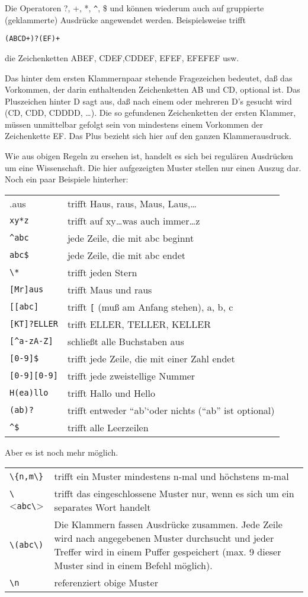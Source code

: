\documentclass[12pt,]{article}
\begin{document}
Die Operatoren ?, +, *, \texttt{\^{}}, \$ und \textbar{} können wiederum
auch auf gruppierte (geklammerte) Ausdrücke angewendet werden.
Beispielsweise trifft

\texttt{(AB\textbar{}CD+)?(EF)+}

die Zeichenketten ABEF, CDEF,CDDEF, EFEF, EFEFEF usw.

Das hinter dem ersten Klammernpaar stehende Fragezeichen bedeutet, daß
das Vorkommen, der darin enthaltenden Zeichenketten AB und CD, optional
ist. Das Pluszeichen hinter D sagt aus, daß nach einem oder mehreren D's
gesucht wird (CD, CDD, CDDDD, \ldots{}). Die so gefundenen Zeichenketten
der ersten Klammer, müssen unmittelbar gefolgt sein von mindestens einem
Vorkommen der Zeichenkette EF. Das Plus bezieht sich hier auf den ganzen
Klammerausdruck.

Wie aus obigen Regeln zu ersehen ist, handelt es sich bei regulären
Ausdrücken um eine Wissenschaft. Die hier aufgezeigten Muster stellen
nur einen Auszug dar. Noch ein paar Beispiele hinterher:

\begin{longtable}[c]{@{}ll@{}}
\toprule
.aus & trifft Haus, raus, Maus, Laus,\ldots{}\tabularnewline
\texttt{xy*z} & trifft auf xy\ldots{}was auch
immer\ldots{}z\tabularnewline
\texttt{\^{}abc} & jede Zeile, die mit abc beginnt\tabularnewline
\texttt{abc\$} & jede Zeile, die mit abc endet\tabularnewline
\texttt{\textbackslash{}*} & trifft jeden Stern\tabularnewline
\texttt{{[}Mr{]}aus} & trifft Maus und raus\tabularnewline
\texttt{{[}{[}abc{]}} & trifft \texttt{{[}} (muß am Anfang stehen), a,
b, c\tabularnewline
\texttt{{[}KT{]}?ELLER} & trifft ELLER, TELLER, KELLER\tabularnewline
\texttt{{[}\^{}a-zA-Z{]}} & schließt alle Buchstaben aus\tabularnewline
\texttt{{[}0-9{]}\$} & trifft jede Zeile, die mit einer Zahl
endet\tabularnewline
\texttt{{[}0-9{]}{[}0-9{]}} & trifft jede zweistellige
Nummer\tabularnewline
\texttt{H(e\textbar{}a)llo} & trifft Hallo und Hello\tabularnewline
\texttt{(ab)?} & trifft entweder ``ab'`oder nichts (``ab'' ist
optional)\tabularnewline
\texttt{\^{}\$} & trifft alle Leerzeilen\tabularnewline
\bottomrule
\end{longtable}

Aber es ist noch mehr möglich.

\begin{longtable}[c]{@{}ll@{}}
\toprule
\texttt{\textbackslash{}\{n,m\textbackslash{}\}} & trifft ein Muster
mindestens n-mal und höchstens m-mal\tabularnewline
\texttt{\textbackslash{}}\textless{}\texttt{abc\textbackslash{}}\textgreater{}
& trifft das eingeschlossene Muster nur, wenn es sich um ein separates
Wort handelt\tabularnewline
\texttt{\textbackslash{}(abc\textbackslash{})} & Die Klammern fassen
Ausdrücke zusammen. Jede Zeile wird nach angegebenen Muster durchsucht
und jeder Treffer wird in einem Puffer gespeichert (max. 9 dieser Muster
sind in einem Befehl möglich).\tabularnewline
\texttt{\textbackslash{}n} & referenziert obige Muster\tabularnewline
\bottomrule
\end{longtable}
\end{document}
